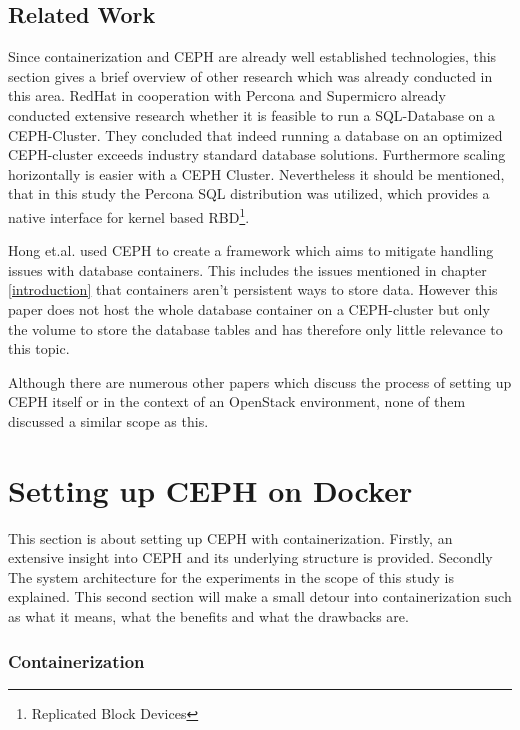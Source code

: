 \documentclass[titlepage, a4paper, 11pt]{scrartcl}
\begin{document}
        \subsection{Related Work}
        
            Since containerization and CEPH are already well established technologies, this section gives a brief overview of 
            other research which was already conducted in this area.
            RedHat in cooperation with Percona and Supermicro already conducted extensive research whether it is feasible to
            run a SQL-Database on a CEPH-Cluster\cite{redhatstudy}. They concluded that indeed running a database on an 
            optimized CEPH-cluster exceeds industry standard database solutions. Furthermore scaling horizontally 
            is easier with a CEPH Cluster. Nevertheless it should be mentioned, that in this study the Percona 
            SQL distribution was utilized, which provides a native interface for kernel based RBD\footnote{Replicated Block Devices}.
            
            Hong et.al. used CEPH to create a framework which aims to mitigate handling issues with database containers.
            This includes the issues mentioned in chapter \ref*{introduction} that containers aren't persistent ways
            to store data\cite{hong2019database}. However this paper does not host the whole database container on a CEPH-cluster but only the volume to store the database tables and has therefore only little relevance to this topic.
            
            Although there are numerous other papers
            which discuss the process of setting up CEPH itself or in the context of an OpenStack environment,
            none of them discussed a similar scope as this.            

    \section{Setting up CEPH on Docker}

        This section is about setting up CEPH with containerization. Firstly, an extensive insight into CEPH and its underlying
        structure is provided. Secondly The system architecture for the experiments in the scope of this study is explained.
        This second section will make a small detour into containerization such as what it means, what the benefits and what the drawbacks are.

        \subsubsection{Containerization}\label{system:containerization}
\end{document}
